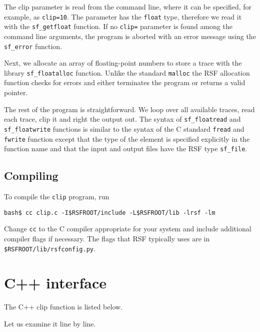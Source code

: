  The
clip parameter is read from the command line, where it can be specified, for
example, as \texttt{clip=10}. The parameter has the \texttt{float} type,
therefore we read it with the \texttt{sf\_getfloat} function. If no
\texttt{clip=} parameter is found among the command line arguments, the
program is aborted with an error message using the \texttt{sf\_error}
function.

 Next,
we allocate an array of floating-point numbers to store a trace with the
library \texttt{sf\_floatalloc} function. Unlike the standard \texttt{malloc}
the RSF allocation function checks for errors and either terminates the
program or returns a valid pointer.

 The
rest of the program is straightforward. We loop over all available traces,
read each trace, clip it and right the output out. The syntax of
\texttt{sf\_floatread} and \texttt{sf\_floatwrite} functions is similar to the
syntax of the C standard \texttt{fread} and \texttt{fwrite} function except
that the type of the element is specified explicitly in the function name and
that the input and output files have the RSF type \texttt{sf\_file}.

\subsection{Compiling}

To compile the \texttt{clip} program, run
\begin{verbatim}
bash$ cc clip.c -I$RSFROOT/include -L$RSFROOT/lib -lrsf -lm
\end{verbatim}
Change \texttt{cc} to the C compiler appropriate for your system and include
additional compiler flags if necessary. The flags that RSF typically uses are
in \texttt{\$RSFROOT/lib/rsfconfig.py}.

\section{C++ interface}

\lstset{language=c++}

The C++ clip function is listed below.



Let us examine it line by line. 

